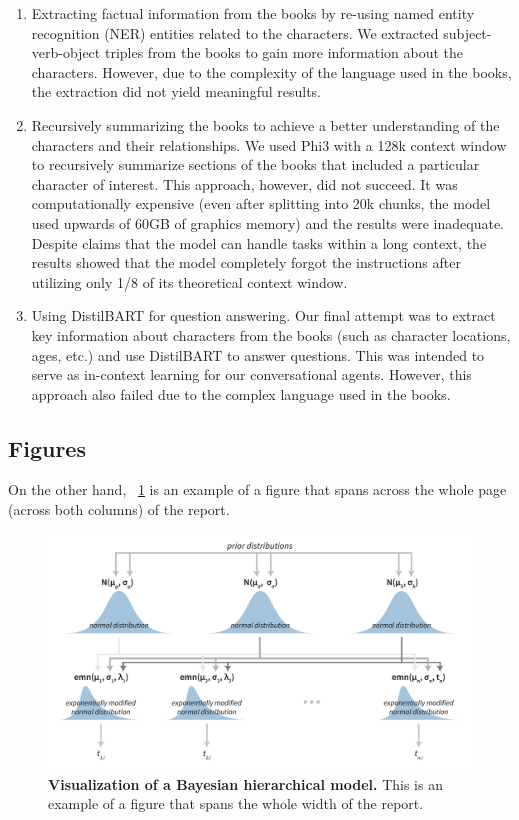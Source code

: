 \documentclass[fleqn,moreauthors,10pt]{ds_report}
\begin{document}
\begin{enumerate}
\item Extracting factual information from the books by re-using named entity recognition (NER) entities related to the characters. We extracted subject-verb-object triples from the books to gain more information about the characters. However, due to the complexity of the language used in the books, the extraction did not yield meaningful results.
	
\item Recursively summarizing the books to achieve a better understanding of the characters and their relationships. We used Phi3 with a 128k context window to recursively summarize sections of the books that included a particular character of interest. This approach, however, did not succeed. It was computationally expensive (even after splitting into 20k chunks, the model used upwards of 60GB of graphics memory) and the results were inadequate. Despite claims that the model can handle tasks within a long context, the results showed that the model completely forgot the instructions after utilizing only 1/8 of its theoretical context window.

\item Using DistilBART for question answering. Our final attempt was to extract key information about characters from the books (such as character locations, ages, etc.) and use DistilBART to answer questions. This was intended to serve as in-context learning for our conversational agents. However, this approach also failed due to the complex language used in the books.

\end{enumerate}

\subsection*{Figures}

On the other hand, \figurename~\ref{fig:whole} is an example of a figure that spans across the whole page (across both columns) of the report.

\begin{figure}[ht]\centering
	\includegraphics[width=\linewidth]{whole_page.pdf}
	\caption{\textbf{Visualization of a Bayesian hierarchical model.} This is an example of a figure that spans the whole width of the report.}
	\label{fig:whole}
\end{figure}
\end{document}
